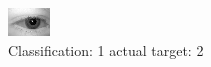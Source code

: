 \begin{figure}[h!]
\begin{center}
\includegraphics[width=0.60\columnwidth]{figures/ID492_class_1_target_2.png}
\end{center}
\caption{ Classification: 1 actual target: 2}
\label{fig:ID492_class_1_target_2}
\end{figure}
